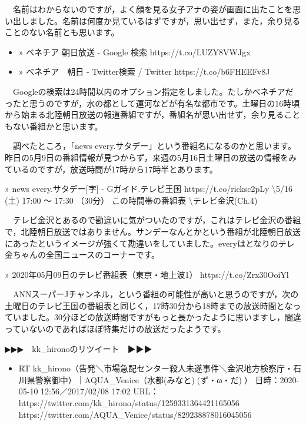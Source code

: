 \documentclass[]{ltjarticle}
\providecommand{\tightlist}{%
  \setlength{\itemsep}{0pt}\setlength{\parskip}{0pt}}
\begin{document}
　名前はわからないのですが，よく顔を見る女子アナの姿が画面に出たことを思い出しました。名前は何度か見ているはずですが，思い出せず，また，余り見ることのない名前とも思います。

\begin{itemize}
\item
  » ベネチア 朝日放送 - Google 検索 https://t.co/LUZY8VWJgx
\item
  » ベネチア　朝日 - Twitter検索 / Twitter https://t.co/b6FHEEFv8J
\end{itemize}

　Googleの検索は24時間以内のオプション指定をしました。たしかベネチアだったと思うのですが，水の都として運河などが有名な都市です。土曜日の16時頃から始まる北陸朝日放送の報道番組ですが，番組名が思い出せず，余り見ることもない番組かと思います。

　調べたところ，「news
every.サタデー」という番組名になるのかと思います。昨日の5月9日の番組情報が見つからず，来週の5月16日土曜日の放送の情報をみているのですが，放送時間が17時から17時半とあります。

» news every.サタデー{[}字{]} - Gガイド.テレビ王国
https://t.co/ricksc2pLy \textbackslash 5/16 (土) 17:00 ～ 17:30 （30分）
この時間帯の番組表 \textbackslash テレビ金沢(Ch.4)

　テレビ金沢とあるので勘違いに気がついたのですが，これはテレビ金沢の番組で，北陸朝日放送ではありません。サンデーなんとかという番組が北陸朝日放送にあったというイメージが強くて勘違いをしていました。everyはとなりのテレ金ちゃんの全国ニュースのコーナーです。

» 2020年05月09日のテレビ番組表（東京・地上波1） https://t.co/Zrx30OoiYl

　ANNスーパーJチャンネル，という番組の可能性が高いと思うのですが，次の土曜日のテレビ王国の番組表と同じく，17時30分から18時までの放送時間となっていました。30分ほどの放送時間ですがもっと長かったように思いますし，間違っていないのであればほぼ特集だけの放送だったようです。

▶▶▶　kk\_hironoのリツイート　▶▶▶

\begin{itemize}
\tightlist
\item
  RT
  kk\_hirono（告発＼市場急配センター殺人未遂事件＼金沢地方検察庁・石川県警察御中）｜AQUA\_Venice（水都(みなと)🌸(ず・ω・だ)🌸）
  日時：2020-05-10 12:56／2017/02/08 17:02 URL：
  https://twitter.com/kk\_hirono/status/1259331364421165056
  https://twitter.com/AQUA\_Venice/status/829238878016045056
\end{itemize}
\end{document}
